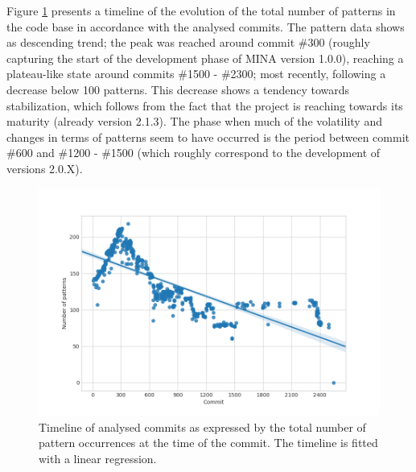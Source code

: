 Figure \ref{fig:commit_timeline} presents a timeline of the evolution of the total number of patterns in the code base in accordance with the analysed commits. The pattern data shows as descending trend; the peak was reached around commit \#300 (roughly capturing the start of the development phase of MINA version 1.0.0), reaching a plateau-like state around commits \#1500 - \#2300; most recently, following a decrease below 100 patterns. This decrease shows a tendency towards stabilization, which follows from the fact that the project is reaching towards its maturity (already version 2.1.3). The phase when much of the volatility and changes in terms of patterns seem to have occurred is the period between commit \#600 and \#1200 - \#1500 (which roughly correspond to the development of versions 2.0.X).  

\begin{figure}[H]
    \centering
    \includegraphics[width =\textwidth]{images/graphs/commit_timeline.png}
    \caption{Timeline of analysed commits as expressed by the total number of pattern occurrences at the time of the commit. The timeline is fitted with a linear regression.}
    \label{fig:commit_timeline}
\end{figure}

